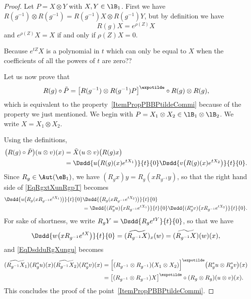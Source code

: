 \begin{proof}
	Let $P=X\otimes Y$ with $X,Y\in\lB_1$. First we have $R(g^{-1})\otimes R(g^{-1})=R(g^{-1})X\otimes R(g^{-1})Y$, but by definition we have
	\begin{equation}
		R(g)X= e^{\rho(Z)}X
	\end{equation}
	and $ e^{\rho(Z)}X=X$ if and only if $\rho(Z)X=0$.
	\begin{probleme}
		Because $ e^{tZ}X$ is a polynomial in $t$ which can only be equal to $X$ when the coefficients of all the powers of $t$ are zero??
	\end{probleme}

	Let us now prove that
	\begin{equation}
		R(g)\circ\tilde P=\big[ R(g^{-1})\otimes R(g^{-1})P \big]^{\expotilde}\circ R(g)\otimes R(g),
	\end{equation}
	which is equivalent to the property~\ref{ItemPropPBBPtildeCommi} because of the property we just mentioned. We begin with $P=X_1\otimes X_2\in\lB_1\otimes \lB_2$. We write $X=X_1\otimes X_2$.

	Using the definitions,
	\begin{equation}		\label{EqRgxtXunRgpT}
		\begin{aligned}[]
			\big( R(g)\circ \tilde P \big)(u\otimes v)(x)&=\tilde X(u\otimes v)\big( R(g)x \big)\\
			&=\Dsdd{ u\big( R(g)(x) e^{tX_1} \big) }{t}{0}\Dsdd{ v\big( R(g)(x) e^{tX_2} \big) }{t}{0}.
		\end{aligned}
	\end{equation}
	Since $R_g\in\Aut(\eB_1)$, we have $(R_gx)y=R_g(xR_{g^{-1}}y)$, so that the right hand side of \eqref{EqRgxtXunRgpT} becomes
	\begin{equation}	\label{EqDsdduRgXungu}
		\begin{aligned}[]
			\Dsdd{ u\big( R_g(xR_{g^{-1}} e^{tX_1}) \big) }{t}{0}&\Dsdd{ \big(   R_g(xR_{g^{-1}} e^{tX_2})    \big) }{t}{0}\\
			&=\Dsdd{ (R^*_gu)\big( xR_{g^{-1}} e^{tX_1}\big)}{t}{0}\Dsdd{ (R^*_gv)\big( xR_{g^{-1}} e^{tX_2} \big) }{t}{0}.
		\end{aligned}
	\end{equation}
	For sake of shortness, we write $R_gY=\Dsdd{ R_g e^{tY} }{t}{0}$, so that we have
	\begin{equation}
			\Dsdd{ w\big( xR_{g^{-1}} e^{tX} \big) }{t}{0}=(\widetilde{ R_{g^{-1}}X })_x(w)
			=\widetilde{ (R_{g^{-1}}X) }(w)(x),
	\end{equation}
	and \eqref{EqDsdduRgXungu} becomes
	\begin{equation}
		\begin{aligned}[]
			(\widetilde{ R_{g^{-1}}X_1 })(R_g^*u)(x)(\widetilde{ R_{g^{-1}}X_2 })(R_g^*v)(x)&=\Big[ (R_{g^{-1}}\otimes R_{g^{-1}})(X_1\otimes X_2) \Big]^{\expotilde}\big( R^*_gu\otimes R^*_gv \big)(x)\\
			&=\big[ (R_{g^{-1}}\otimes R_{g^{-1}})X \big]^{\expotilde}\circ(R_g\otimes R_g)(u\otimes v)(x).
		\end{aligned}
	\end{equation}
	This concludes the proof of the point~\ref{ItemPropPBBPtildeCommi}.


\end{proof}
